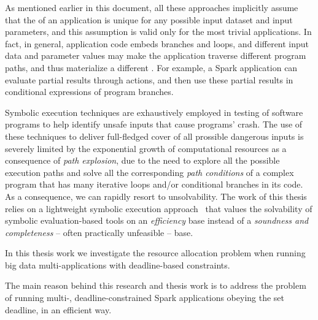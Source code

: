 As mentioned earlier in this document, all these approaches implicitly assume that the \plan of an application is unique for any possible input dataset and input parameters, and this assumption is valid only for the most trivial applications. In fact, in general, application code embeds branches and loops, and different input data and parameter values may make the application traverse different program paths, and thus materialize a different \plan. For example, a Spark application can evaluate partial results through actions, and then use these partial results in conditional expressions of program branches.

Symbolic execution techniques are exhaustively employed in testing of software programs to help identify unsafe inputs that cause programs' crash. The use of these techniques to deliver full-fledged cover of all prossible dangerous inputs is severely limited by the exponential growth of computational resources as a consequence of \textit{path explosion}, due to the need to explore all the possible execution paths and solve all the corresponding \textit{path conditions} of a complex program that has many iterative loops and/or conditional branches in its code. As a consequence, we can rapidly resort to unsolvability. The work of this thesis relies on a lightweight symbolic execution  approach~\cite{Baresi-Quattrocchi-Denaro:2019} that values the solvability of symbolic evaluation-based tools on an \textit{efficiency} base instead of a \textit{soundness and completeness} -- often practically unfeasible -- base.

In this thesis work we investigate the resource allocation problem when running big data multi-\plan applications with deadline-based \qos constraints. 

The main reason behind this research and thesis work is to address the problem of running multi-\plan, deadline-constrained Spark applications obeying the set deadline, in an efficient way.

